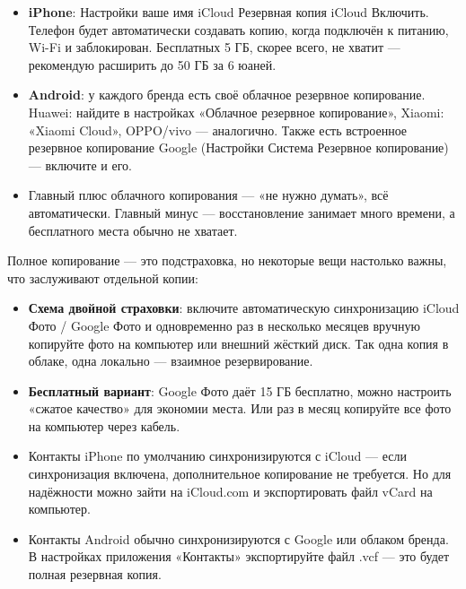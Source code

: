 
\begin{itemize}
  \item \textbf{iPhone}: Настройки ваше имя iCloud Резервная копия iCloud Включить. Телефон будет автоматически создавать копию, когда подключён к питанию, Wi-Fi и заблокирован. Бесплатных 5 ГБ, скорее всего, не хватит — рекомендую расширить до 50 ГБ за 6 юаней.
  \item \textbf{Android}: у каждого бренда есть своё облачное резервное копирование. Huawei: найдите в настройках «Облачное резервное копирование», Xiaomi: «Xiaomi Cloud», OPPO/vivo — аналогично. Также есть встроенное резервное копирование Google (Настройки Система Резервное копирование) — включите и его.
  \item Главный плюс облачного копирования — «не нужно думать», всё автоматически. Главный минус — восстановление занимает много времени, а бесплатного места обычно не хватает.
\end{itemize}


Полное копирование — это подстраховка, но некоторые вещи настолько важны, что заслуживают отдельной копии:


\begin{itemize}
  \item \textbf{Схема двойной страховки}: включите автоматическую синхронизацию iCloud Фото / Google Фото и одновременно раз в несколько месяцев вручную копируйте фото на компьютер или внешний жёсткий диск. Так одна копия в облаке, одна локально — взаимное резервирование.
  \item \textbf{Бесплатный вариант}: Google Фото даёт 15 ГБ бесплатно, можно настроить «сжатое качество» для экономии места. Или раз в месяц копируйте все фото на компьютер через кабель.
\end{itemize}


\begin{itemize}
  \item Контакты iPhone по умолчанию синхронизируются с iCloud — если синхронизация включена, дополнительное копирование не требуется. Но для надёжности можно зайти на iCloud.com и экспортировать файл vCard на компьютер.
  \item Контакты Android обычно синхронизируются с Google или облаком бренда. В настройках приложения «Контакты» экспортируйте файл .vcf — это будет полная резервная копия.
\end{itemize}

